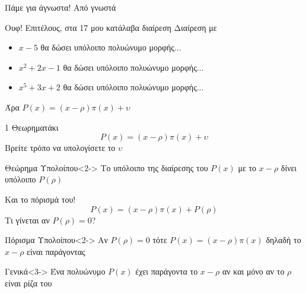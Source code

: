 \documentclass{presentation}
\begin{document}
\begin{frame}[t]{Πάμε για άγνωστα!}
  Από γνωστά

\end{frame}

\begin{frame}{Ουφ! Επιτέλους, στα 17 μου κατάλαβα διαίρεση}
  Διαίρεση με
  \begin{itemize}
    \item<1-> $x-5$ θα δώσει υπόλοιπο πολυώνυμο μορφής...
    \item<2-> $x^2+2x-1$ θα δώσει υπόλοιπο πολυώνυμο μορφής...
    \item<3-> $x^5+3x+2$ θα δώσει υπόλοιπο πολυώνυμο μορφής...
  \end{itemize}
   Άρα $P(x)=(x-ρ)π(x)+υ$
\end{frame}

\begin{frame}{1 Θεωρηματάκι}
  $$P(x)=(x-ρ)π(x)+υ$$
  Βρείτε τρόπο να υπολογίσετε το $υ$
  \begin{block}{Θεώρημα Υπολοίπου}<2->
    Το υπόλοιπο της διαίρεσης του $P(x)$ με το $x-ρ$ δίνει υπόλοιπο $P(ρ)$
  \end{block}
\end{frame}

\begin{frame}{Και το πόρισμά του!}
  $$P(x)=(x-ρ)π(x)+P(ρ)$$
  Τι γίνεται αν $P(ρ)=0$?
  \begin{block}{Πόρισμα Υπολοίπου}<2->
    Αν $P(ρ)=0$ τότε $P(x)=(x-ρ)π(x)$ δηλαδή το $x-ρ$ είναι παράγοντας
  \end{block}

  \begin{block}{Γενικά}<3->
    Ένα πολυώνυμο $P(x)$ έχει παράγοντα το $x-ρ$ αν και μόνο αν το $ρ$ είναι ρίζα του
  \end{block}

\end{frame}
\end{document}
